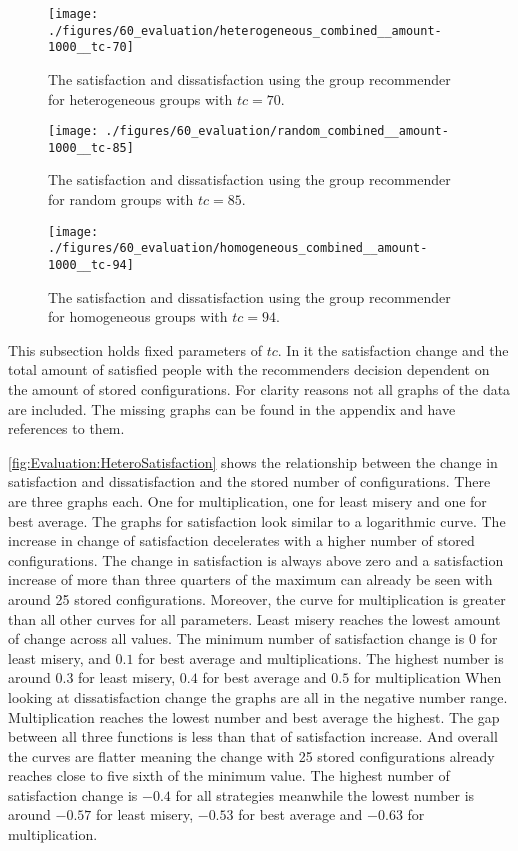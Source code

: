 \begin{figure}[p]
    \centering
    \texttt{[image: ./figures/60\_evaluation/heterogeneous\_combined\_\_amount-1000\_\_tc-70]}
    \caption{The satisfaction and dissatisfaction using the group recommender for heterogeneous groups with $tc = 70$.}
    \label{fig:Evaluation:HeteroSatisfaction}
\end{figure}

\begin{figure}[p]
    \centering
    \texttt{[image: ./figures/60\_evaluation/random\_combined\_\_amount-1000\_\_tc-85]}
    \caption{The satisfaction and dissatisfaction using the group recommender for random groups with $tc = 85$.}
    \label{fig:Evaluation:RandomSatisfaction}
\end{figure}

\begin{figure}[p]
    \centering
    \texttt{[image: ./figures/60\_evaluation/homogeneous\_combined\_\_amount-1000\_\_tc-94]}
    \caption{The satisfaction and dissatisfaction using the group recommender for homogeneous groups with $tc = 94$.}
    \label{fig:Evaluation:HomoSatisfaction}
\end{figure}





This subsection holds fixed parameters of $tc$. In it the satisfaction change and the total amount of satisfied people with the recommenders decision dependent on the amount of stored configurations. For clarity reasons not all graphs of the data are included. The missing graphs can be found in the appendix and have references to them.

\autoref{fig:Evaluation:HeteroSatisfaction} shows the relationship between the change in satisfaction and dissatisfaction and the stored number of configurations. There are three graphs each. One for multiplication, one for least misery and one for best average. The graphs for satisfaction look similar to a logarithmic curve. The increase in change of satisfaction decelerates with a higher number of stored configurations. The change in satisfaction is always above zero and a satisfaction increase of more than three quarters of the maximum can already be seen with around 25 stored configurations. Moreover, the curve for multiplication is greater than all other curves for all parameters. Least misery reaches the lowest amount of change across all values. The minimum number of satisfaction change is $0$ for least misery, and $0.1$ for best average and multiplications. The highest number is around $0.3$ for least misery, $0.4$ for best average and $0.5$ for multiplication
When looking at dissatisfaction change the graphs are all in the negative number range. Multiplication reaches the lowest number and best average the highest. The gap between all three functions is less than that of satisfaction increase. And overall the curves are flatter meaning the change with 25 stored configurations already reaches close to five sixth of the minimum value. The highest number of satisfaction change is $-0.4$ for all strategies meanwhile the lowest number is around $-0.57$ for least misery, $-0.53$ for best average and $-0.63$ for multiplication.

